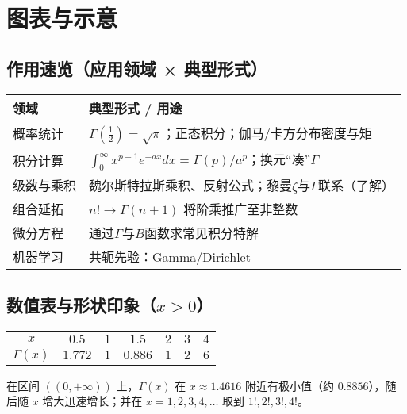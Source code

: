 \documentclass[UTF8,a4paper,12pt]{ctexart}
\numberwithin{equation}{section}
\begin{document}
\section{图表与示意}
\subsection*{作用速览（应用领域 × 典型形式）}
\begin{tcolorbox}
\small
\setlength{\tabcolsep}{4pt}
\begin{tabularx}{\linewidth}{@{}Y Y@{}}
\toprule
\textbf{领域} & \textbf{典型形式 / 用途} \\
\midrule
概率统计 & $\Gamma(\tfrac{1}{2})=\sqrt{\pi}$；正态积分；伽马/卡方分布密度与矩 \\
积分计算 & $\int_0^{\infty} x^{p-1} e^{-a x} dx = \Gamma(p)/a^p$；换元“凑”$\Gamma$ \\
级数与乘积 & 魏尔斯特拉斯乘积、反射公式；黎曼$\zeta$与$\Gamma$联系（了解） \\
组合延拓 & $n!\to\Gamma(n+1)$ 将阶乘推广至非整数 \\
微分方程 & 通过$\Gamma$与$B$函数求常见积分特解 \\
机器学习 & 共轭先验：Gamma/Dirichlet \\
\bottomrule
\end{tabularx}
\end{tcolorbox}

\subsection*{数值表与形状印象（$x>0$）}
\begin{tcolorbox}
\small
\setlength{\tabcolsep}{6pt}
\begin{tabularx}{\linewidth}{@{}C C C C C C C@{}}
\toprule
$x$ & $0.5$ & $1$ & $1.5$ & $2$ & $3$ & $4$ \\
\midrule
$\Gamma(x)$ & $1.772$ & $1$ & $0.886$ & $1$ & $2$ & $6$ \\
\bottomrule
\end{tabularx}
\end{tcolorbox}

在区间 $((0, +\infty))$ 上，$\Gamma(x)$ 在 $x\approx 1.4616$ 附近有极小值（约 $0.8856$），随后随 $x$ 增大迅速增长；并在 $x=1,2,3,4,\ldots$ 取到 $1!,2!,3!,4!$。
\end{document}
